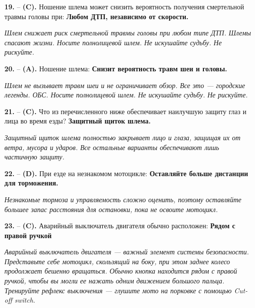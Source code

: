 \begin{minipage}{\linewidth}
\noindent\textbf{19.}  -- \textbf {(C).} Ношение шлема может снизить вероятность получения смертельной травмы головы при:  \textbf {Любом ДТП, независимо от скорости.} \par \textit {Шлем снижает риск смертельной травмы головы при любом типе ДТП. Шлемы спасают жизни. Носите полнолицевой шлем. Не искушайте судьбу. Не рискуйте.} \\
\end{minipage}

\begin{minipage}{\linewidth}
\noindent\textbf{20.}  -- \textbf {(A).} Ношение шлема:  \textbf {Снизит вероятность травм шеи и головы.} \par \textit {Шлем не вызывает травм шеи и не ограничивает обзор. Все это — городские легенды. ОБС. Носите полнолицевой шлем. Не искушайте судьбу. Не рискуйте.} \\
\end{minipage}

\begin{minipage}{\linewidth}
\noindent\textbf{21.}  -- \textbf {(C).} Что из перечисленного ниже обеспечивает наилучшую защиту глаз и лица во время езды?  \textbf {Защитный щиток шлема.} \par \textit {Защитный щиток шлема полностью закрывает лицо и глаза, защищая их от ветра, мусора и ударов. Все остальные варианты обеспечивают лишь частичную защиту.} \\
\end{minipage}

\begin{minipage}{\linewidth}
\noindent\textbf{22.}  -- \textbf {(D).} При езде на незнакомом мотоцикле:  \textbf {Оставляйте больше дистанции для торможения.} \par \textit {Незнакомые тормоза и управляемость сложно оценить, поэтому оставляйте большее запас расстояния для остановки, пока не освоите мотоцикл.} \\
\end{minipage}

\begin{minipage}{\linewidth}
\noindent\textbf{23.}  -- \textbf {(C).} Аварийный выключатель двигателя обычно расположен:  \textbf {Рядом с правой ручкой} \par \textit {Аварийный выключатель двигателя — важный элемент системы безопасности. Представьте себе мотоцикл, скользящий на боку, при этом заднее колесо продолжает бешенно вращаться. Обычно кнопка находится рядом с правой ручкой, чтобы вы могли ее нажать одним движением большого пальца. Тренируйте рефлекс выключения — глушите мото на порковке с помощью Cut-off switch.} \\
\end{minipage}

